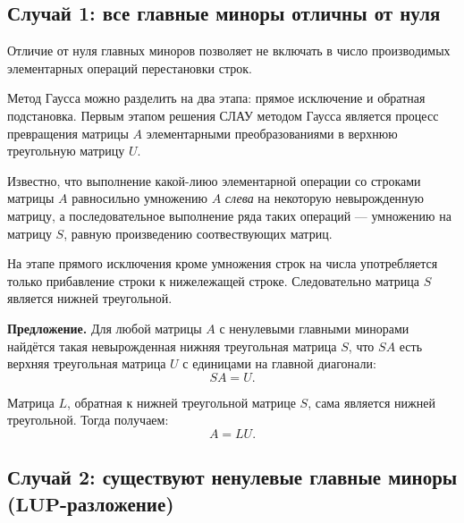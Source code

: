 \documentclass[11pt,a4paper]{article}
\begin{document}
    \hypertarget{ux441ux43bux443ux447ux430ux439-1-ux432ux441ux435-ux433ux43bux430ux432ux43dux44bux435-ux43cux438ux43dux43eux440ux44b-ux43eux442ux43bux438ux447ux43dux44b-ux43eux442-ux43dux443ux43bux44f}{%
\subsection{Случай 1: все главные миноры отличны от
нуля}\label{ux441ux43bux443ux447ux430ux439-1-ux432ux441ux435-ux433ux43bux430ux432ux43dux44bux435-ux43cux438ux43dux43eux440ux44b-ux43eux442ux43bux438ux447ux43dux44b-ux43eux442-ux43dux443ux43bux44f}}

Отличие от нуля главных миноров позволяет не включать в число
производимых элементарных операций перестановки строк.

Метод Гаусса можно разделить на два этапа: прямое исключение и обратная
подстановка. Первым этапом решения СЛАУ методом Гаусса является процесс
превращения матрицы \(A\) элементарными преобразованиями в верхнюю
треугольную матрицу \(U\).

Известно, что выполнение какой-лиюо элементарной операции со строками
матрицы \(A\) равносильно умножению \(A\) \emph{слева} на некоторую
невырожденную матрицу, а последовательное выполнение ряда таких операций
--- умножению на матрицу \(S\), равную произведению соотвествующих
матриц.

На этапе прямого исключения кроме умножения строк на числа употребляется
только прибавление строки к нижележащей строке. Следовательно матрица
\(S\) является нижней треугольной.

\textbf{Предложение.} Для любой матрицы \(A\) с ненулевыми главными
минорами найдётся такая невырожденная нижняя треугольная матрица \(S\),
что \(SA\) есть верхняя треугольная матрица \(U\) с единицами на главной
диагонали: \[ SA = U. \]

Матрица \(L\), обратная к нижней треугольной матрице \(S\), сама
является нижней треугольной. Тогда получаем: \[ A = LU. \]

    \hypertarget{ux441ux43bux443ux447ux430ux439-2-ux441ux443ux449ux435ux441ux442ux432ux443ux44eux442-ux43dux435ux43dux443ux43bux435ux432ux44bux435-ux433ux43bux430ux432ux43dux44bux435-ux43cux438ux43dux43eux440ux44b-mathbflup-ux440ux430ux437ux43bux43eux436ux435ux43dux438ux435}{%
\subsection{\texorpdfstring{Случай 2: существуют ненулевые главные
миноры
(\(\mathbf{LUP}\)-разложение)}{Случай 2: существуют ненулевые главные миноры (\textbackslash{}mathbf\{LUP\}-разложение)}}\label{ux441ux43bux443ux447ux430ux439-2-ux441ux443ux449ux435ux441ux442ux432ux443ux44eux442-ux43dux435ux43dux443ux43bux435ux432ux44bux435-ux433ux43bux430ux432ux43dux44bux435-ux43cux438ux43dux43eux440ux44b-mathbflup-ux440ux430ux437ux43bux43eux436ux435ux43dux438ux435}}
\end{document}
